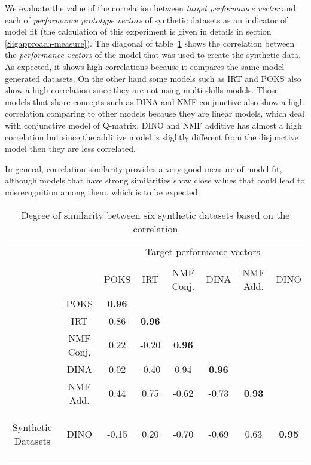 We evaluate the value of the correlation between \textit{target performance vector} and each of \textit{performance prototype vectors} of synthetic datasets as an indicator of model fit (the calculation of this experiment is given in details in section \ref{Sigapproach-measure}). The diagonal of table~\ref{tablSyn} shows the correlation between the \textit{performance vectors} of the model that was used to create the synthetic data. As expected, it shows high correlations because it compares the same model generated datasets. On the other hand some models such as IRT and POKS also show a high correlation since they are not using multi-skills models. Those models that share concepts such as DINA and NMF conjunctive also show a high correlation comparing to other models because they are linear models, which deal with conjunctive model of Q-matrix. DINO and NMF additive has almost a high correlation but since the additive model is slightly different from the disjunctive model then they are less correlated.

In general, correlation similarity provides a very good measure of model fit, although models that have strong similarities show close values that could lead to misrecognition among them, which is to be expected.

\begin{table}[h]
\center
\begin{tabular}{c|c|c|c|c|c|c|c|}
\multicolumn{2}{c}{} & \multicolumn{6}{c}{Target performance vectors} \tabularnewline
\multicolumn{8}{c}{} \tabularnewline
\cline{3-8} 
\multicolumn{2}{c|}{} & POKS & IRT & NMF Conj. & DINA & NMF Add. & DINO\tabularnewline
\cline{2-8}
\cline{2-3}
&POKS & \textbf {0.96} & \multicolumn{1}{|c}{} & \multicolumn{1}{c}{} & \multicolumn{1}{c}{} & \multicolumn{1}{c}{}\tabularnewline
\cline{2-4}
&IRT & 0.86 & \textbf {0.96} & \multicolumn{1}{|c}{} & \multicolumn{1}{c}{} & \multicolumn{1}{c}{} & \multicolumn{1}{c}{}\tabularnewline
\cline{2-5}
&NMF Conj. & 0.22 & -0.20 & \textbf {0.96} & \multicolumn{1}{|c}{} & \multicolumn{1}{c}{} & \multicolumn{1}{c}{}\tabularnewline
\cline{2-6}
&DINA & 0.02 & -0.40 & 0.94 & \textbf {0.96} & \multicolumn{1}{|c}{} & \multicolumn{1}{c}{}\tabularnewline
\cline{2-7}
&NMF Add. & 0.44 & 0.75 & -0.62 & -0.73 & \textbf {0.93} & \multicolumn{1}{|c}{}\tabularnewline
\cline{2-8}
\multicolumn{1}{c|}{\multirow{-6}{*}{\begin{sideways}Synthetic Datasets\end{sideways}}}&DINO & -0.15 & 0.20 & -0.70 & -0.69 & 0.63 & \textbf {0.95}\tabularnewline
\cline{2-8}
\end{tabular}
\caption{Degree of similarity between six synthetic datasets based on the correlation}
\label{tablSyn}
\end{table}

